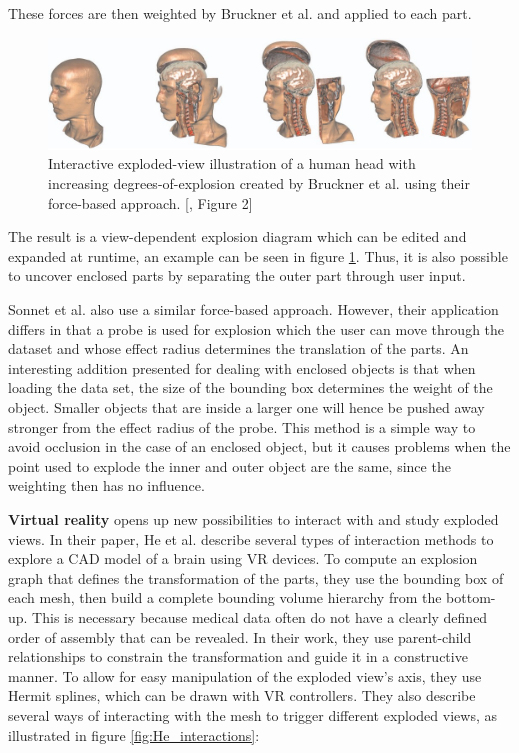 These forces are then weighted by Bruckner et al. and applied to each part.
\begin{figure}[t]
	\centering
	\includegraphics[width=.95\linewidth]{fig/Images/Bruckner_fig2}
	\caption[]{Interactive exploded-view illustration of a human head with increasing degrees-of-explosion created by Bruckner et al. using their force-based approach. [\cite{Bruckner_2006}, Figure 2]}
	\label{fig:bruckner}
\end{figure}
The result is a view-dependent explosion diagram which can be edited and expanded at runtime, an example can be seen in figure \ref{fig:bruckner}. 
Thus, it is also possible to uncover enclosed parts by separating the outer part through user input.

Sonnet et al. also use a similar force-based approach.\cite{Sonnet_2004}
However, their application differs in that a probe is used for explosion which the user can move through the dataset and whose effect radius determines the translation of the parts. 
An interesting addition presented for dealing with enclosed objects is that when loading the data set, the size of the bounding box determines the weight of the object. 
Smaller objects that are inside a larger one will hence be pushed away stronger from the effect radius of the probe. 
This method is a simple way to avoid occlusion in the case of an enclosed object, but it causes problems when the point used to explode the inner and outer object are the same, since the weighting then has no influence.

\textbf{Virtual reality} opens up new possibilities to interact with and study exploded views. In their paper, He et al. describe several types of interaction methods to explore a CAD model of a brain using VR devices.\cite{He2017}
To compute an explosion graph that defines the transformation of the parts, they use the bounding box of each mesh, then build a complete bounding volume hierarchy from the bottom-up.
This is necessary because medical data often do not have a clearly defined order of assembly that can be revealed. 
In their work, they use parent-child relationships to constrain the transformation and guide it in a constructive manner.
To allow for easy manipulation of the exploded view's axis, they use Hermit splines, which can be drawn with VR controllers. They also describe several ways of interacting with the mesh to trigger different exploded views, as illustrated in figure \ref{fig:He_interactions}:

